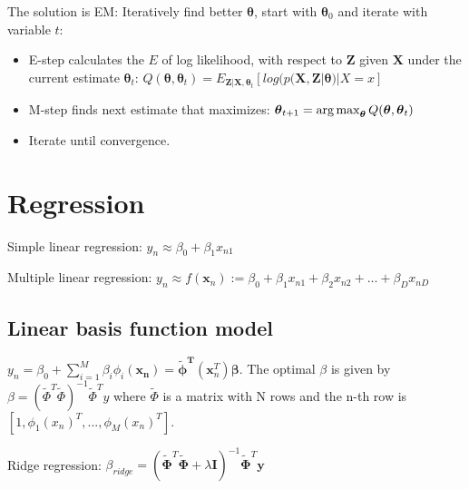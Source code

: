 \documentclass[10pt,a4paper,landscape]{article}
\providecommand{\bf}[1]{\ensuremath{\mathbf{#1}}}
\newcommand{\bbeta}{\boldsymbol\beta}
\newcommand{\btheta}{\boldsymbol\theta}
\begin{document}
\begin{multicols*}{4}
The solution is EM: Iteratively find better $\btheta$, start with $\btheta_0$ and iterate with variable $t$:
\begin{itemize}
\item E-step calculates the $E$ of log likelihood, with respect to $\bf{Z}$ given $\bf{X}$ under the current estimate $\btheta_t$: $Q(\btheta, \btheta_t) = E_{\bf{Z}|\bf{X},\btheta_t} [ log ( p(\bf{X}, \bf{Z} | \btheta) | X = x ]$
\item M-step finds next estimate that maximizes: $\btheta_{t+1} = \argmax_{\btheta} Q(\btheta, \btheta_t)$
\item Iterate until convergence.
\end{itemize}

\section{Regression}
Simple linear regression: $y_n \approx \beta_0 + \beta_1 x_{n1}$

Multiple linear regression: $y_n \approx f(\bf{x}_n) := \beta_0 + \beta_1 x_{n1} + \beta_2 x_{n2} + ... + \beta_D x_{nD}$

\subsection{Linear basis function model}
$y_n = \beta_0 + \sum_{i=1}^{M} \beta_i \phi_i(\bf{x_n}) =  \bf{\tilde\phi^T}(\bf{x}^T_n) \bbeta$.
The optimal $\beta$ is given by $\beta = ( \tilde{\Phi}^T \tilde{\Phi})^{-1} \tilde{\Phi}^T y$ where $\tilde{\Phi}$ is a matrix with N rows and the n-th row is $[1, \phi_1(x_n)^T,  ...,  \phi_M(x_n)^T]$.

Ridge regression: $\beta_{ridge} = ( \tilde{\boldsymbol\Phi}^T \tilde{\boldsymbol\Phi} + \lambda \boldsymbol I)^{-1} \tilde{\boldsymbol\Phi}^T \boldsymbol y$


\end{multicols*}
\end{document}
